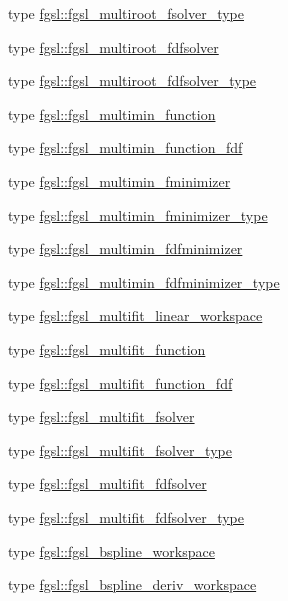 \begin{DoxyCompactItemize}
type \hyperlink{structfgsl_1_1fgsl__multiroot__fsolver__type}{fgsl\-::fgsl\-\_\-multiroot\-\_\-fsolver\-\_\-type}
\item 
type \hyperlink{structfgsl_1_1fgsl__multiroot__fdfsolver}{fgsl\-::fgsl\-\_\-multiroot\-\_\-fdfsolver}
\item 
type \hyperlink{structfgsl_1_1fgsl__multiroot__fdfsolver__type}{fgsl\-::fgsl\-\_\-multiroot\-\_\-fdfsolver\-\_\-type}
\item 
type \hyperlink{structfgsl_1_1fgsl__multimin__function}{fgsl\-::fgsl\-\_\-multimin\-\_\-function}
\item 
type \hyperlink{structfgsl_1_1fgsl__multimin__function__fdf}{fgsl\-::fgsl\-\_\-multimin\-\_\-function\-\_\-fdf}
\item 
type \hyperlink{structfgsl_1_1fgsl__multimin__fminimizer}{fgsl\-::fgsl\-\_\-multimin\-\_\-fminimizer}
\item 
type \hyperlink{structfgsl_1_1fgsl__multimin__fminimizer__type}{fgsl\-::fgsl\-\_\-multimin\-\_\-fminimizer\-\_\-type}
\item 
type \hyperlink{structfgsl_1_1fgsl__multimin__fdfminimizer}{fgsl\-::fgsl\-\_\-multimin\-\_\-fdfminimizer}
\item 
type \hyperlink{structfgsl_1_1fgsl__multimin__fdfminimizer__type}{fgsl\-::fgsl\-\_\-multimin\-\_\-fdfminimizer\-\_\-type}
\item 
type \hyperlink{structfgsl_1_1fgsl__multifit__linear__workspace}{fgsl\-::fgsl\-\_\-multifit\-\_\-linear\-\_\-workspace}
\item 
type \hyperlink{structfgsl_1_1fgsl__multifit__function}{fgsl\-::fgsl\-\_\-multifit\-\_\-function}
\item 
type \hyperlink{structfgsl_1_1fgsl__multifit__function__fdf}{fgsl\-::fgsl\-\_\-multifit\-\_\-function\-\_\-fdf}
\item 
type \hyperlink{structfgsl_1_1fgsl__multifit__fsolver}{fgsl\-::fgsl\-\_\-multifit\-\_\-fsolver}
\item 
type \hyperlink{structfgsl_1_1fgsl__multifit__fsolver__type}{fgsl\-::fgsl\-\_\-multifit\-\_\-fsolver\-\_\-type}
\item 
type \hyperlink{structfgsl_1_1fgsl__multifit__fdfsolver}{fgsl\-::fgsl\-\_\-multifit\-\_\-fdfsolver}
\item 
type \hyperlink{structfgsl_1_1fgsl__multifit__fdfsolver__type}{fgsl\-::fgsl\-\_\-multifit\-\_\-fdfsolver\-\_\-type}
\item 
type \hyperlink{structfgsl_1_1fgsl__bspline__workspace}{fgsl\-::fgsl\-\_\-bspline\-\_\-workspace}
\item 
type \hyperlink{structfgsl_1_1fgsl__bspline__deriv__workspace}{fgsl\-::fgsl\-\_\-bspline\-\_\-deriv\-\_\-workspace}
\end{DoxyCompactItemize}
